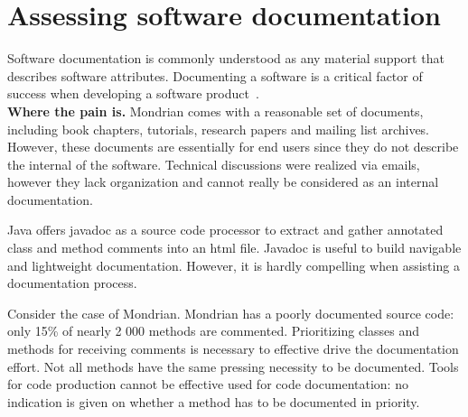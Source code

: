 \documentclass[runningheads]{llncs}
\newcommand{\sd}[1]{\nb{SD}{orange}{#1}}
\newcommand{\seclabel}[1]{\label{sec:#1}}
\newcommand{\myparagraph}[1]{\noindent \textbf{#1.}}
\begin{document}

\section{Assessing software documentation}\seclabel{documentationblueprint}

Software documentation is commonly understood as any material support that describes software attributes. Documenting a software is a critical factor of success when developing a software product~\cite{Paul03a}.\\

\myparagraph{Where the pain is} 
Mondrian comes with a reasonable set of documents, including book chapters, tutorials, research papers and mailing list archives. However, these documents are essentially for end users since they do not describe the internal of the software. Technical discussions were realized via emails, however they lack organization and cannot really be considered as an internal documentation. 

Java offers javadoc as a source code processor to extract and gather annotated class and method comments into an html file. Javadoc is useful to build navigable and lightweight documentation. However, it is hardly compelling when assisting a documentation process.

Consider the case of Mondrian. Mondrian has a poorly documented source code: only 15\% of nearly 2 000 methods are commented. Prioritizing classes and methods for receiving comments is necessary to effective drive the documentation effort. Not all methods have the same pressing necessity to be documented. Tools for code production cannot be effective used for code documentation: no indication is given on whether a method has to be documented in priority. \\

\end{document}
